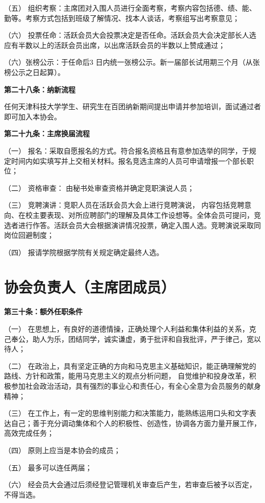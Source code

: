 \documentclass{mjsart}
\begin{document}
（五） 组织考察：主席团对入围人员进行全面考察，考察内容包括德、绩、能、勤等。考察方式包括到班级了解情况、找本人谈话，考察组写出考察意见；

（六） 投票任命：活跃会员大会投票决定是否任命。活跃会员大会决定部长人选应有半数以上的活跃会员出席，以出席活跃会员的半数以上赞成通过；

（六）张榜公示：于任命后3 日内统一张榜公示。新一届部长试用期三个月（从张榜公示之日起算）。

\textbf{第二十八条：纳新流程}

任何天津科技大学学生、研究生在百团纳新期间提出申请并参加培训，面试通过者即可加入本协会。

\textbf{第二十九条：主席换届流程}

（一） 报名：采取自愿报名的方式。符合报名资格且有意参加选举的同学，于规定时间内如实填写并上交相关材料。报名竞选主席的人员可申请增报一个部长职位；

（二） 资格审查： 由秘书处审查资格并确定竞职演说人员；

（三） 竞聘演讲：竞职人员在活跃会员大会上进行竞聘演说， 内容包括竞聘意向、在校主要表现、对所应聘部门的理解及具体工作设想等。全体会员可提问，竞选者进行作答。活跃会员大会根据演讲情况投票，确定入围人选。竞聘演说采取同岗位回避制度；

（四） 报请学院根据学院有关规定确定最终人选。

\section{协会负责人（主席团成员）}

\textbf{第三十条：额外任职条件}

（一） 在思想上，有良好的道德情操，正确处理个人利益和集体利益的关系，克己奉公，助人为乐，团结同学，诚实谦虚，勇于批评和自我批评，严于律己，宽以待人；

（二） 在政治上，具有坚定正确的方向和马克思主义基础知识，能正确理解党的路线、方针和政策，能用马克思主义的观点分析问题， 自觉维护和投身改革，积极参加社会政治活动，具有强烈的事业心和责任心，有全心全意为会员服务的献身精神；

（三） 在工作上，有一定的思维判别能力和决策能力，能熟练运用口头和文字表达自己；善于充分调动集体和个人的积极性、创造性，协调各方面力量开展工作，高效完成任务；

（四） 原则上应当是本协会的成员；

（五） 最多可以连任两届；

（六） 经会员大会通过后须经登记管理机关审查后产生，若审查后被予以否定，不得当选。
\end{document}
